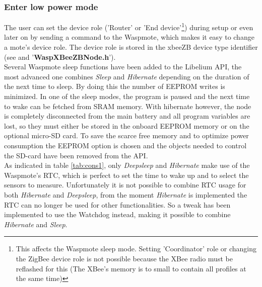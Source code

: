 \subsubsection{Enter low power mode}
The user can set the device role ('Router' or 'End device'\footnote{This affects the Waspmote sleep mode. Setting 'Coordinator' role or changing the ZigBee device role is not possible because the XBee radio must be reflashed for this (The XBee's memory is to small to contain all profiles at the same time)}) during setup or even later on by sending a command to the Waspmote, which makes it easy to change a mote's device role. The device role is stored in the xbeeZB device type identifier (see  and '\textbf{WaspXBeeZBNode.h}').\\ 
Several Waspmote sleep functions have been added to the Libelium API, the most advanced one combines \textit{Sleep} and \textit{Hibernate} depending on the duration of the next time to sleep. By doing this the number of EEPROM writes is minimized. In one of the sleep modes, the program is paused and the next time to wake can be fetched from SRAM memory. With hibernate however, the node is completely disconnected from the main battery and all program variables are lost, so they must either be stored in the onboard EEPROM memory or on the optional micro-SD card. To save the scarce free memory and to optimize power consumption the EEPROM option is chosen and the objects needed to control the SD-card have been removed from the API.\\
As indicated in table \ref{tab:cons1}, only \textit{Deepsleep} and \textit{Hibernate} make use of the Waspmote's RTC, which is perfect to set the time to wake up and to select the sensors to measure. Unfortunately it is not possible to combine RTC usage for both \textit{Hibernate} and \textit{Deepsleep}, from the moment \textit{Hibernate} is implemented the RTC can no longer be used for other functionalities. So a tweak has been implemented to use the Watchdog instead, making it possible to combine \textit{Hibernate} and \textit{Sleep}.\\
